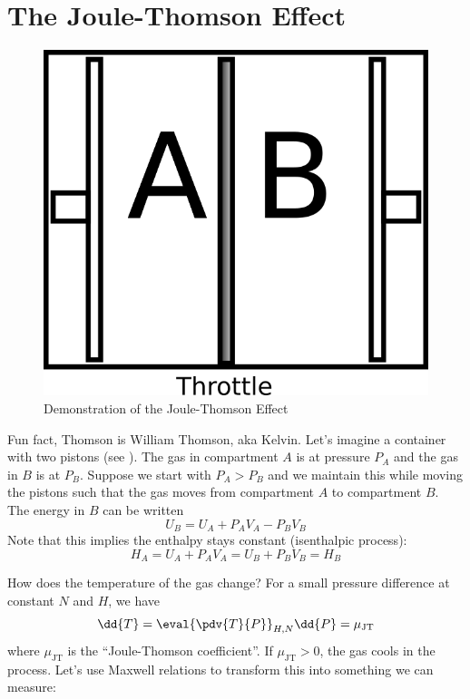 \documentclass[a4paper,twoside,master.tex]{subfiles}
\begin{document}
\section{The Joule-Thomson Effect}
\label{sec:the_joule-thomson_effect}
\begin{figure}[h]
    \centering
    \includegraphics[width=\textwidth/2]{figures/lec_17_joule_thomson.png}
    \caption{Demonstration of the Joule-Thomson Effect}
    \label{fig:joule_thomson}
\end{figure}
Fun fact, Thomson is William Thomson, aka Kelvin. Let's imagine a container with two pistons (see ). The gas in compartment $ A $ is at pressure $ P_A $ and the gas in $ B $ is at $ P_B $. Suppose we start with $ P_A > P_B $ and we maintain this while moving the pistons such that the gas moves from compartment $ A $ to compartment $ B $. The energy in $ B $ can be written
\begin{equation}
    U_B = U_A + P_A V_A - P_B V_B
\end{equation}
Note that this implies the enthalpy stays constant (isenthalpic process):
\begin{equation}
    H_A = U_A + P_A V_A = U_B + P_B V_B = H_B
\end{equation}

How does the temperature of the gas change? For a small pressure difference at constant $ N $ and $ H $, we have
\begin{equation}
    \dd{T} = \eval{\pdv{T}{P}}_{H,N} \dd{P} = \mu_{\text{JT}}
\end{equation}
where $ \mu_{\text{JT}} $ is the ``Joule-Thomson coefficient''. If $ \mu_{\text{JT}} > 0 $, the gas cools in the process. Let's use Maxwell relations to transform this into something we can measure:
\end{document}

